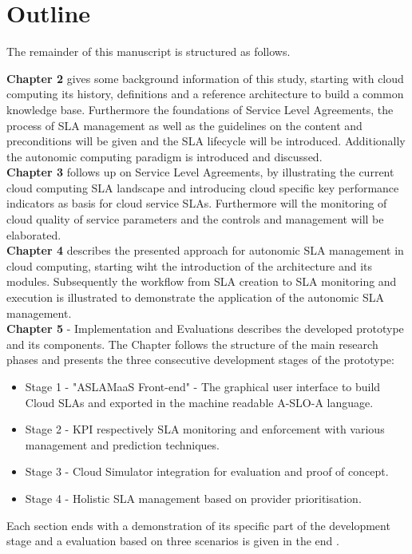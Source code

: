 \section{Outline}
The remainder of this manuscript is structured as follows. 

\textbf{Chapter 2} gives some background information of this study, starting with cloud computing its history,  definitions and a reference architecture to build a common knowledge base. Furthermore the foundations of Service Level Agreements, the process of SLA management as well as the guidelines on the content and preconditions will be given and the SLA lifecycle will be introduced. Additionally the autonomic computing paradigm is introduced and discussed.\\

\textbf{Chapter 3} follows up on Service Level Agreements, by illustrating the current cloud computing SLA landscape and introducing cloud specific key performance indicators as basis for cloud service SLAs. Furthermore will the monitoring of cloud quality of service parameters and the controls and management will be elaborated.\\

\textbf{Chapter 4}  describes the presented approach for autonomic SLA management in cloud computing, starting wiht the introduction of the architecture and its modules. Subsequently the workflow from SLA creation to SLA monitoring and execution is illustrated to demonstrate the application of the autonomic SLA management.\\


\textbf{Chapter 5 }- Implementation and Evaluations describes the developed prototype and its components. The Chapter follows the structure of the main research phases and presents the three consecutive development stages of the prototype:
\begin{itemize}
\item  Stage 1 - "ASLAMaaS Front-end" - The graphical user interface to build Cloud SLAs and exported in the machine readable A-SLO-A language.
 \item Stage 2 - KPI respectively SLA monitoring and enforcement with various management and prediction techniques.
 \item Stage 3 - Cloud Simulator integration for evaluation and proof of concept. 
 \item Stage 4 - Holistic SLA management based on provider prioritisation.
\end{itemize}
 Each section ends with a demonstration of its specific part of the development stage and a evaluation based on three scenarios is given in the end .\\

